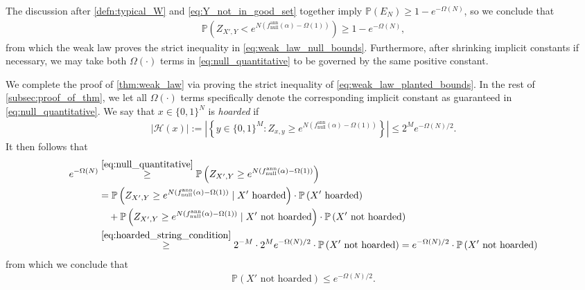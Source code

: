 \documentclass[11pt]{amsart}
\numberwithin{equation}{section}
\numberwithin{equation}{section}
\newcommand{\1}{\mathbbm{1}}
\newcommand{\Prob}{\mathbb{P}}
\newcommand{\fnullann}{f_{\mathrm{null}}^{\mathrm{ann}}}
\theoremstyle{definition}
\begin{document}
The discussion after \cref{defn:typical_W} and \eqref{eq:Y_not_in_good_set} together imply $\Prob(E_N) \geq 1 - e^{-\Omega(N)}$, so we conclude that
\begin{align} \label{eq:null_quantitative}
    \Prob\left( Z_{X', Y} < e^{N\left( \fnullann(\alpha) - \Omega(1) \right)} \right) \geq 1 - e^{-\Omega(N)},
\end{align}
from which the weak law proves the strict inequality in \eqref{eq:weak_law_null_bounds}. Furthermore, after shrinking implicit constants if necessary, we may take both $\Omega(\cdot)$ terms in \eqref{eq:null_quantitative} to be governed by the same positive constant.

\smallskip

We complete the proof of \cref{thm:weak_law} via proving the strict inequality of \eqref{eq:weak_law_planted_bounds}. In the rest of \cref{subsec:proof_of_thm}, we let all $\Omega(\cdot)$ terms specifically denote the corresponding implicit constant as guaranteed in \eqref{eq:null_quantitative}. We say that $x \in \{0,1\}^{N}$ is \emph{hoarded} if
\begin{align} \label{eq:hoarded_string_condition}
     \left| \mathcal H(x) \right| := \left| \left\{ y \in \{0,1\}^M : Z_{x,y} \geq e^{N\left( \fnullann(\alpha) - \Omega(1) \right)} \right\} \right| \leq 2^M e^{-\Omega(N)/2}.
\end{align}
It then follows that
\begin{align*}
    e^{-\Omega(N)} & \stackrel{\eqref{eq:null_quantitative}}{\geq} \Prob\left( Z_{X', Y} \geq e^{N\left( \fnullann(\alpha) - \Omega(1) \right)} \right) \\
    & = \Prob\left( Z_{X', Y} \geq e^{N\left( \fnullann(\alpha) - \Omega(1) \right)} \mid X' \text{ hoarded} \right) \cdot \Prob\left( X' \text{ hoarded} \right) \\
    & \quad + \Prob\left( Z_{X', Y} \geq e^{N\left( \fnullann(\alpha) - \Omega(1) \right)} \mid X' \text{ not hoarded} \right) \cdot \Prob\left( X' \text{ not hoarded} \right) \\
    & \stackrel{\eqref{eq:hoarded_string_condition}}{\geq} 2^{-M} \cdot 2^M e^{-\Omega(N)/2} \cdot \Prob\left( X' \text{ not hoarded} \right) = e^{-\Omega(N)/2} \cdot \Prob\left( X' \text{ not hoarded} \right)
\end{align*}
from which we conclude that
\begin{align} \label{eq:hoarded_prob_bd}
    \Prob\left( X' \text{ not hoarded} \right) \leq e^{-\Omega(N)/2}.
\end{align}
\end{document}
